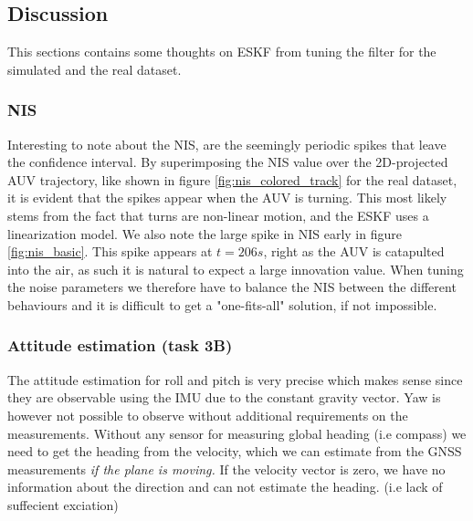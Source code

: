 \subsection{Discussion}
This sections contains some thoughts on ESKF from tuning the filter for the simulated and the real dataset.

\subsubsection{NIS}
Interesting to note about the NIS, are the seemingly periodic spikes that leave the confidence interval. By superimposing the NIS value over the 2D-projected AUV trajectory, like shown in figure \ref{fig:nis_colored_track} for the real dataset, it is evident that the spikes appear when the AUV is turning. This most likely stems from the fact that turns are non-linear motion, and the ESKF uses a linearization model. We also note the large spike in NIS early in figure \ref{fig:nis_basic}. This spike appears at $t=206s$, right as the AUV is catapulted into the air, as such it is natural to expect a large innovation value. When tuning the noise parameters we therefore have to balance the NIS between the different behaviours and it is difficult to get a "one-fits-all" solution, if not impossible. 

\subsubsection{Attitude estimation (task 3B)}
The attitude estimation for roll and pitch is very precise which makes sense since they are observable using the IMU due to the constant gravity vector. Yaw is however not possible to observe without additional requirements on the measurements. Without any sensor for measuring global heading (i.e compass) we need to get the heading from the velocity, which we can estimate from the GNSS measurements \textit{if the plane is moving.} If the velocity vector is zero, we have no information about the direction and can not estimate the heading. (i.e lack of suffecient exciation) 

